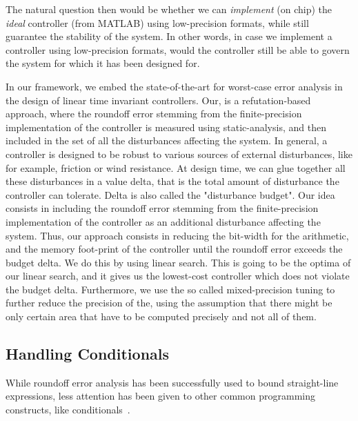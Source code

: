 The natural question then would be whether we can \emph{implement} (on chip) the \emph{ideal} controller (from MATLAB) using low-precision formats, while still guarantee the stability of the system.
%
In other words, in case we implement a controller using low-precision formats, would the controller still be able to govern the system for which it has been designed for.
%

In our framework, we embed the state-of-the-art for worst-case error analysis in the design of linear time invariant controllers.
%
Our, is a refutation-based approach, where the roundoff error stemming from the finite-precision implementation of the controller is measured using static-analysis, and then included in the set of all the disturbances affecting the system.
%
In general, a controller is designed to be robust to various sources of external disturbances, like for example, friction or wind resistance.
%
At design time, we can glue together all these disturbances in a value delta, that is the total amount of disturbance the controller can tolerate.
%
Delta is also called the "disturbance budget".
%
Our idea consists in including the roundoff error stemming from the finite-precision implementation of the controller as an additional disturbance affecting the system.
%
Thus, our approach consists in reducing the bit-width for the arithmetic, and the memory foot-print of the controller until the roundoff error exceeds the budget delta.
%
We do this by using linear search.
%
This is going to be the optima of our linear search, and it gives us the lowest-cost controller which does not violate the budget delta. 
%
Furthermore, we use the so called mixed-precision tuning to further reduce the precision of the, using the assumption that there might be only certain area that have to be computed precisely and not all of them.

%
%  
%  
%
%
%
%

\subsection{Handling Conditionals}
%
%
While roundoff error analysis has been successfully used to bound straight-line expressions, less attention has been given to other common programming constructs, like conditionals~\cite{precisa, fluctuat}.
%

